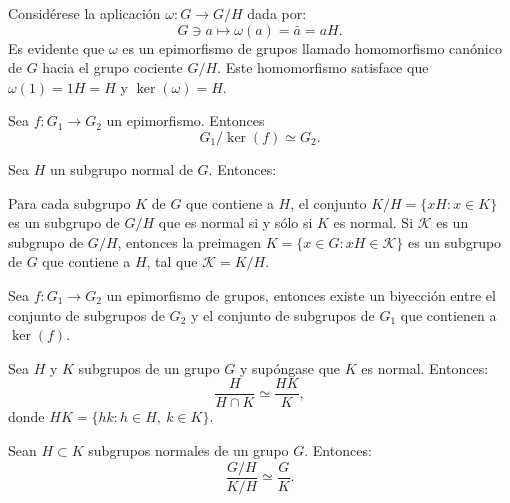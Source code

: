 Considérese la aplicación $\omega \colon G \to G/H$ dada por: \[G \ni a \mapsto \omega(a) = 	\bar{a} = aH. \]
\indent Es evidente que $\omega$ es un epimorfismo de grupos llamado homomorfismo canónico de $G$ hacia el grupo cociente $G/H$. Este homomorfismo satisface que $\omega(1) = 1H = H$ y $\ker(\omega) = H.$ 
\begin{corolario}
Sea $f \colon G_1 \to G_2$ un epimorfismo. Entonces \[ G_1/\ker(f) \simeq G_2. \]
\end{corolario}
\newpage
\begin{lema}
Sea $H$ un subgrupo normal de $G$. Entonces:
\begin{bulletList}
\newItem Para cada subgrupo $K$ de $G$ que contiene a $H$, el conjunto $K/H = \{ xH \colon x \in K \}$ es un subgrupo de $G/H$ que es normal si y sólo si $K$ es normal.
\newItem Si $\mathcal{K}$ es un subgrupo de $G/H$, entonces la preimagen $K = \{ x \in G \colon xH \in \mathcal{K} \}$ es un subgrupo de $G$ que contiene a $H$, tal que $\mathcal{K} = K/H$.
\end{bulletList}
\end{lema}
\begin{teorema}
Sea $f \colon G_1 \to G_2$ un epimorfismo de grupos, entonces existe un biyección entre el conjunto de subgrupos de $G_2$ y el conjunto de subgrupos de $G_1$ que contienen a $\ker(f)$.
\end{teorema}
\begin{teorema}
Sea $H$ y $K$ subgrupos de un grupo $G$ y supóngase que $K$ es normal. Entonces: \[ \frac{H}{H \cap K} \simeq \frac{HK}{K}, \] donde $HK = \{ hk \colon h \in H, \ k \in K \}$.
\end{teorema}
\begin{teorema}
Sean $H \subset K$ subgrupos normales de un grupo $G$. Entonces:
\[\frac{G/H}{K/H} \simeq \frac{G}{K}. \]
\end{teorema}
